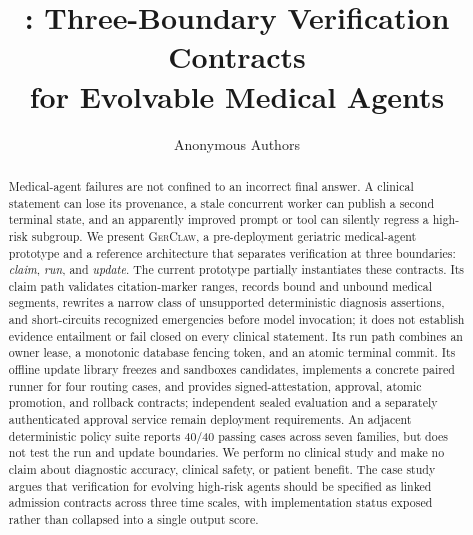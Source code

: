 \documentclass{article}
\title{\system: Three-Boundary Verification Contracts\\
for Evolvable Medical Agents}
\author{Anonymous Authors}
\newcommand{\system}{\textsc{GerClaw}}
\begin{document}
\maketitle

\begin{abstract}
Medical-agent failures are not confined to an incorrect final answer.  A
clinical statement can lose its provenance, a stale concurrent worker can
publish a second terminal state, and an apparently improved prompt or tool can
silently regress a high-risk subgroup.  We present \system, a pre-deployment
geriatric medical-agent prototype and a reference architecture that separates
verification at three boundaries: \emph{claim}, \emph{run}, and
\emph{update}.  The current prototype partially instantiates these contracts.
Its claim path validates citation-marker ranges, records bound and unbound
medical segments, rewrites a narrow class of unsupported deterministic
diagnosis assertions, and short-circuits recognized emergencies before model
invocation; it does not establish evidence entailment or fail closed on every
clinical statement.  Its run path combines an owner lease, a monotonic
database fencing token, and an atomic terminal commit.  Its offline update
library freezes and sandboxes candidates, implements a concrete paired runner
for four routing cases, and provides signed-attestation, approval, atomic
promotion, and rollback contracts; independent sealed evaluation and a
separately authenticated approval service remain deployment requirements.
An adjacent deterministic policy suite reports 40/40 passing cases across
seven families, but does not test the run and update boundaries.  We perform
no clinical study and make no claim about diagnostic accuracy, clinical
safety, or patient benefit.  The case study argues that verification for
evolving high-risk agents should be specified as linked admission contracts
across three time scales, with implementation status exposed rather than
collapsed into a single output score.
\end{abstract}













\end{document}
